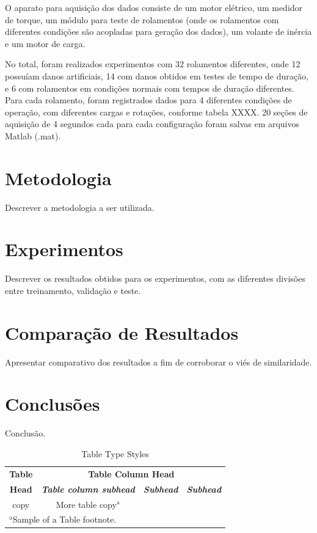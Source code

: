 \documentclass[conference]{IEEEtran}
\begin{document}
O aparato para aquisição dos dados consiste de um motor elétrico, um medidor de torque, um módulo para teste de rolamentos (onde os rolamentos com diferentes condições são acopladas para geração dos dados), um volante de inércia e um motor de carga.

No total, foram realizados experimentos com 32 rolamentos diferentes, onde 12 possuíam danos artificiais, 14 com danos obtidos em testes de tempo de duração, e 6 com rolamentos em condições normais com tempos de duração diferentes.
Para cada rolamento, foram registrados dados para 4 diferentes condições de operação, com diferentes cargas e rotações, conforme tabela XXXX.
20 seções de aquisição de 4 segundos cada para cada configuração foram salvas em arquivos Matlab (.mat).


\section{Metodologia}

Descrever a metodologia a ser utilizada.

\section{Experimentos}

Descrever os resultados obtidos para os experimentos, com as diferentes divisões entre treinamento, validação e teste.

\section{Comparação de Resultados}

Apresentar comparativo dos resultados a fim de corroborar o viés de similaridade.

\section{Conclusões}

Conclusão.



\begin{table}[htbp]
\caption{Table Type Styles}
\begin{center}
\begin{tabular}{|c|c|c|c|}
\hline
\textbf{Table}&\multicolumn{3}{|c|}{\textbf{Table Column Head}} \\
\cline{2-4} 
\textbf{Head} & \textbf{\textit{Table column subhead}}& \textbf{\textit{Subhead}}& \textbf{\textit{Subhead}} \\
\hline
copy& More table copy$^{\mathrm{a}}$& &  \\
\hline
\multicolumn{4}{l}{$^{\mathrm{a}}$Sample of a Table footnote.}
\end{tabular}
\label{tab1}
\end{center}
\end{table}
\end{document}
